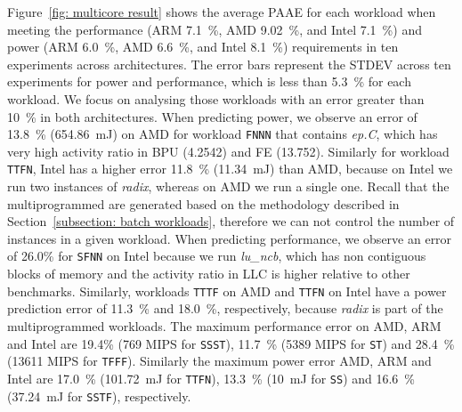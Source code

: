  Figure~\ref{fig: multicore result} shows the average PAAE for each workload when meeting
the performance (ARM \SI{7.1}{\percent}, AMD \SI{9.02}{\percent}, and Intel
\SI{7.1}{\percent}) and power (ARM \SI{6.0}{\percent}, AMD \SI{6.6}{\percent}, and Intel
\SI{8.1}{\percent}) requirements in ten experiments across architectures. The error bars
represent the STDEV across ten experiments for power and performance, which is less than
\SI{5.3}{\percent} for each workload. We focus on analysing those workloads with an error
greater than \SI{10}{\percent} in both architectures. When predicting power, we observe an
error of \SI{13.8}{\percent} (\SI{654.86}{\milli\joule}) on AMD for workload \texttt{FNNN}
that contains \emph{ep.C}, which has very high activity ratio in BPU (4.2542) and FE
(13.752).  Similarly for workload \texttt{TTFN}, Intel has a higher error
\SI{11.8}{\percent} (\SI{11.34}{\milli\joule}) than AMD, because on Intel we run two
instances of \emph{radix}, whereas on AMD we run a single one. Recall that the
multiprogrammed are generated based on the methodology described in
Section~\ref{subsection: batch workloads}, therefore we can not control  the number of
instances in a given workload. When predicting performance, we observe an error of 26.0\%
for \texttt{SFNN} on Intel because we run \emph{lu\_ncb}, which has non contiguous blocks
of memory and the activity ratio in LLC is higher relative to other benchmarks.
Similarly, workloads \texttt{TTTF} on AMD and \texttt{TTFN} on Intel have a power
prediction error of \SI{11.3}{\percent} and \SI{18.0}{\percent}, respectively, because
\emph{radix} is part of the multiprogrammed workloads.  The maximum performance error on
AMD, ARM and Intel are 19.4\% (769 MIPS for \texttt{SSST}), \SI{11.7}{\percent} (5389 MIPS
for \texttt{ST}) and \SI{28.4}{\percent} (13611 MIPS for \texttt{TFFF}). Similarly the
maximum power error AMD, ARM and Intel are \SI{17.0}{\percent} (\SI{101.72}{\milli\joule}
for \texttt{TTFN}), \SI{13.3}{\percent} (\SI{10}{\milli\joule} for \texttt{SS}) and
\SI{16.6}{\percent} (\SI{37.24}{\milli\joule} for \texttt{SSTF}), respectively. 

